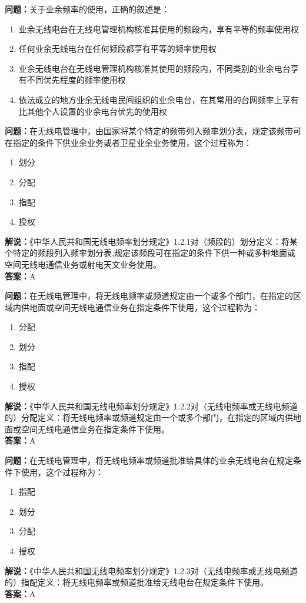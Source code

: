 \textbf{问题：}关于业余频率的使用，正确的叙述是：
\begin{enumerate}[label=\Alph*), leftmargin=1cm]
	\item 业余无线电台在无线电管理机构核准其使用的频段内，享有平等的频率使用权
	\item 任何业余无线电台在任何频段都享有平等的频率使用权
	\item 业余无线电台在无线电管理机构核准其使用的频段内，不同类别的业余电台享有不同优先程度的频率使用权
	\item 依法成立的地方业余无线电民间组织的业余电台，在其常用的台网频率上享有比其他个人设置的业余电台优先的使用权
\end{enumerate}

\textbf{问题：}在无线电管理中，由国家将某个特定的频带列入频率划分表，规定该频带可在指定的条件下供业余业务或者卫星业余业务使用，这个过程称为：
\begin{enumerate}[label=\Alph*), leftmargin=1cm]
	\item 划分
	\item 分配
	\item 指配
	\item 授权
\end{enumerate}
\textbf{解说：}《中华人民共和国无线电频率划分规定》1.2.1对（频段的）划分定义：将某个特定的频段列入频率划分表,规定该频段可在指定的条件下供一种或多种地面或空间无线电通信业务或射电天文业务使用。\\
\textbf{答案：}A

\textbf{问题：}在无线电管理中，将无线电频率或频道规定由一个或多个部门，在指定的区域内供地面或空间无线电通信业务在指定条件下使用，这个过程称为：
\begin{enumerate}[label=\Alph*), leftmargin=1cm]
	\item 分配
	\item 划分
	\item 指配
	\item 授权
\end{enumerate}
\textbf{解说：}《中华人民共和国无线电频率划分规定》1.2.2对（无线电频率或无线电频道的）分配定义：将无线电频率或频道规定由一个或多个部门，在指定的区域内供地面或空间无线电通信业务在指定条件下使用。\\
\textbf{答案：}A

\textbf{问题：}在无线电管理中，将无线电频率或频道批准给具体的业余无线电台在规定条件下使用，这个过程称为：
\begin{enumerate}[label=\Alph*), leftmargin=1cm]
	\item 指配
	\item 划分
	\item 分配
	\item 授权
\end{enumerate}
\textbf{解说：}《中华人民共和国无线电频率划分规定》1.2.3对（无线电频率或无线电频道的）指配定义：将无线电频率或频道批准给无线电台在规定条件下使用。\\
\textbf{答案：}A

